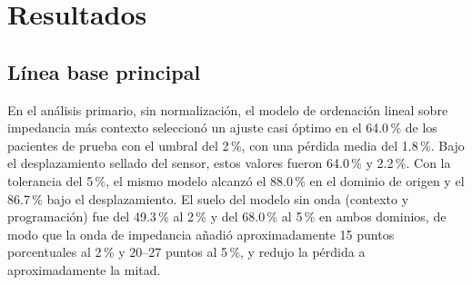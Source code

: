 \documentclass[11pt,a4paper]{article}
\begin{document}
\section{Resultados}

\subsection{Línea base principal}

En el análisis primario, sin normalización, el modelo de ordenación lineal sobre
impedancia más contexto seleccionó un ajuste casi óptimo en el 64.0\,\% de los
pacientes de prueba con el umbral del 2\,\%, con una pérdida media del 1.8\,\%.
Bajo el desplazamiento sellado del sensor, estos valores fueron 64.0\,\% y
2.2\,\%. Con la tolerancia del 5\,\%, el mismo modelo alcanzó el 88.0\,\% en el
dominio de origen y el 86.7\,\% bajo el desplazamiento. El suelo del modelo sin
onda (contexto y programación) fue del 49.3\,\% al 2\,\% y del 68.0\,\% al
5\,\% en ambos dominios, de modo que la onda de impedancia añadió
aproximadamente 15 puntos porcentuales al 2\,\% y 20--27 puntos al 5\,\%, y
redujo la pérdida a aproximadamente la mitad.

\begin{table}[htbp]
\centering
\small
\caption{Línea base principal con las tolerancias casi óptimas del 2\,\% y del
5\,\% (sin normalización intrapaciente). La pérdida es la pérdida media relativa
de trabajo sistólico.}
\label{tab:primary}
\end{table}
\end{document}
